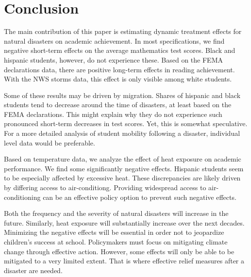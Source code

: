\section{Conclusion} \label{Conclusion}

The main contribution of this paper is estimating dynamic treatment effects for natural disasters on academic achievement. In most specifications, we find negative short-term effects on the average mathematics test scores. Black and hispanic students, however, do not experience these. Based on the FEMA declarations data, there are positive long-term effects in reading achievement. With the NWS storms data, this effect is only visible among white students.

Some of these results may be driven by migration. Shares of hispanic and black students tend to decrease around the time of disasters, at least based on the FEMA declarations. This might explain why they do not experience such pronounced short-term decreases in test scores. Yet, this is somewhat speculative. For a more detailed analysis of student mobility following a disaster, individual level data would be preferable.

Based on temperature data, we analyze the effect of heat exposure on academic performance. We find some significantly negative effects. Hispanic students seem to be especially affected by excessive heat. These discrepancies are likely driven by differing access to air-conditiong. Providing widespread access to air-conditioning can be an effective policy option to prevent such negative effects.

Both the frequency and the severity of natural disasters will increase in the future. Similarly, heat exposure will substantially increase over the next decades. Minimizing the negative effects will be essential in order not to jeopardize children's success at school. Policymakers must focus on mitigating climate change through effective action. However, some effects will only be able to be mitigated to a very limited extent. That is where effective relief measures after a disaster are needed.





